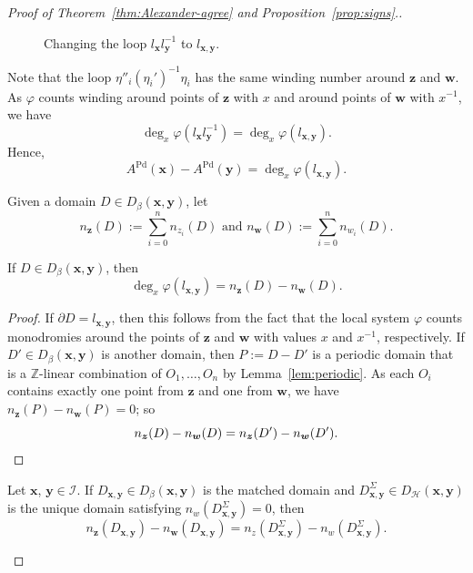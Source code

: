 \documentclass[11pt]{amsart}
\numberwithin{equation}{section}
\numberwithin{figure}{section}
\theoremstyle{definition}
\newcommand{\cH}{\mathcal{H}}
\newcommand{\cI}{\mathcal{I}}
\newcommand{\bZ}{\mathbb{Z}}
\DeclareMathOperator{\Pd}{Pd}
\newcommand{\ws}{\boldsymbol{w}}
\newcommand{\xs}{\boldsymbol{x}}
\newcommand{\ys}{\boldsymbol{y}}
\newcommand{\zs}{\boldsymbol{z}}
\begin{document}
\begin{proof}[Proof of Theorem~\ref{thm:Alexander-agree} and Proposition~\ref{prop:signs}.]
\begin{figure}
\centering
\def\svgwidth{0.9\textwidth}

\caption{Changing the loop $l_{\xs}l_{\ys}^{-1}$ to $l_{\xs,\ys}$.}
\label{Ex2}
\end{figure} 
   
Note that the loop $\eta''_i(\eta_i')^{-1} \eta_i$ has the same winding number around $\zs$ and $\ws$. As $\varphi$ counts winding around points of $\zs$ with $x$ and around points of $\ws$ with $x^{-1}$, we have
\begin{equation}
  \deg_x \varphi\left(l_{\xs} l_{\ys}^{-1} \right)= \deg_x \varphi(l_{\xs,\ys}).
\end{equation}
Hence,
\begin{equation}\label{pdgrad}
A^{\Pd}(\xs)-A^{\Pd}(\ys)= \deg_x \varphi(l_{\xs,\ys}).
\end{equation}

Given a domain $D \in D_{\beta}(\xs,\ys)$, let 
\[
n_{\zs}(D) := \sum_{i=0}^n n_{z_i}(D) \text{ and } n_{\ws}(D) := \sum_{i=0}^n n_{w_i}(D).
\]

\begin{prop}
If $D \in D_{\beta}(\xs,\ys)$, then
\begin{equation}\label{r1}
  \deg_x \varphi\left( l_{\xs,\ys} \right)=n_{\zs}(D) - n_{\ws}(D).
\end{equation}
\end{prop}

\begin{proof}
If $\partial D = l_{\xs,\ys}$, then this follows from the fact that the local system $\varphi$ counts monodromies around the points of $\zs$ and $\ws$ with values $x$ and $x^{-1}$, respectively. If $D' \in D_{\beta}(\xs,\ys)$ is another domain, then $P := D-D'$ is a periodic domain that is a $\bZ$-linear combination of $O_1,\dots,O_n$ by Lemma~\ref{lem:periodic}. As each $O_i$ contains exactly one point from $\zs$ and one from $\ws$, we have $n_{\zs}(P) - n_{\ws}(P) = 0$; so
\[
n_{\zs}(D) - n_{\ws}(D) = n_{\zs}(D') - n_{\ws}(D'). \qedhere
\]
\end{proof}

\begin{prop}\label{chdom}
    Let $\xs$, $\ys \in \cI$. If $D_{\xs,\ys} \in D_{\beta}(\xs,\ys)$ is the matched domain and $D^{\Sigma}_{\xs,\ys} \in D_{\cH}(\xs,\ys)$ is the unique domain satisfying $n_w(D^{\Sigma}_{\xs,\ys}) = 0$, then
    \begin{equation}\label{r2}
        n_{\zs}(D_{\xs,\ys})-n_{\ws}(D_{\xs,\ys}) = n_z \left(D^{\Sigma}_{\xs,\ys}\right)-n_w \left( D^{\Sigma}_{\xs,\ys} \right).
    \end{equation}
\end{prop}


\end{proof}
\end{document}
